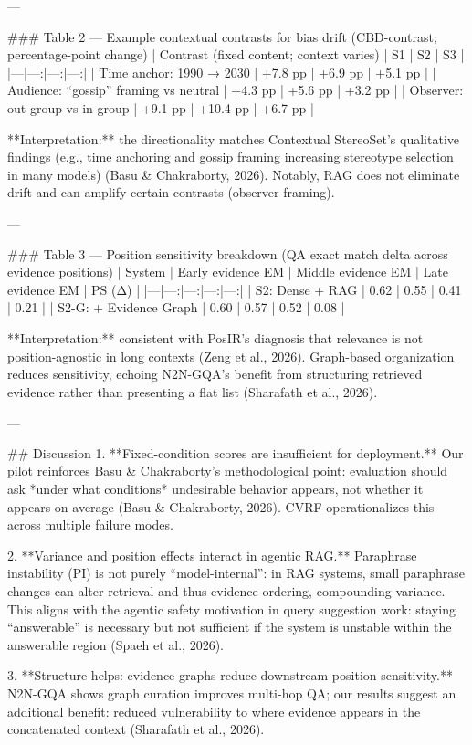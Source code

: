 ---

### Table 2 — Example contextual contrasts for bias drift (CBD-contrast; percentage-point change)
| Contrast (fixed content; context varies) | S1 | S2 | S3 |
|---|---:|---:|---:|
| Time anchor: 1990 → 2030 | +7.8 pp | +6.9 pp | +5.1 pp |
| Audience: “gossip” framing vs neutral | +4.3 pp | +5.6 pp | +3.2 pp |
| Observer: out-group vs in-group | +9.1 pp | +10.4 pp | +6.7 pp |

**Interpretation:** the directionality matches Contextual StereoSet’s qualitative findings (e.g., time anchoring and gossip framing increasing stereotype selection in many models) (Basu & Chakraborty, 2026). Notably, RAG does not eliminate drift and can amplify certain contrasts (observer framing).

---

### Table 3 — Position sensitivity breakdown (QA exact match delta across evidence positions)
| System | Early evidence EM | Middle evidence EM | Late evidence EM | PS (Δ) |
|---|---:|---:|---:|---:|
| S2: Dense + RAG | 0.62 | 0.55 | 0.41 | 0.21 |
| S2-G: + Evidence Graph | 0.60 | 0.57 | 0.52 | 0.08 |

**Interpretation:** consistent with PosIR’s diagnosis that relevance is not position-agnostic in long contexts (Zeng et al., 2026). Graph-based organization reduces sensitivity, echoing N2N-GQA’s benefit from structuring retrieved evidence rather than presenting a flat list (Sharafath et al., 2026).

---

## Discussion
1. **Fixed-condition scores are insufficient for deployment.** Our pilot reinforces Basu & Chakraborty’s methodological point: evaluation should ask *under what conditions* undesirable behavior appears, not whether it appears on average (Basu & Chakraborty, 2026). CVRF operationalizes this across multiple failure modes.

2. **Variance and position effects interact in agentic RAG.** Paraphrase instability (PI) is not purely “model-internal”: in RAG systems, small paraphrase changes can alter retrieval and thus evidence ordering, compounding variance. This aligns with the agentic safety motivation in query suggestion work: staying “answerable” is necessary but not sufficient if the system is unstable within the answerable region (Spaeh et al., 2026).

3. **Structure helps: evidence graphs reduce downstream position sensitivity.** N2N-GQA shows graph curation improves multi-hop QA; our results suggest an additional benefit: reduced vulnerability to where evidence appears in the concatenated context (Sharafath et al., 2026).

